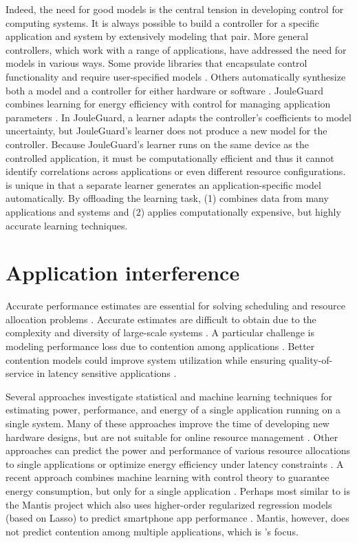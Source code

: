 Indeed, the need for good models is the central tension in developing
control for computing systems.  It is always possible to build a
controller for a specific application and system by extensively
modeling that pair.  More general controllers, which work with a range
of applications, have addressed the need for models in various ways.
Some provide libraries that encapsulate control functionality and
require user-specified models
\cite{ControlWare,Sojka,Rajkumar,POET,SWiFT}.  Others automatically
synthesize both a model and a controller for either hardware
\cite{josep-isca2016} or software \cite{ICSE2014,FSE2015}.  JouleGuard
combines learning for energy efficiency with control for managing
application parameters \cite{JouleGuard}.  In JouleGuard, a learner
adapts the controller's coefficients to model uncertainty, but
JouleGuard's learner does not produce a new model for the controller.
Because JouleGuard's learner runs on the same device as the controlled
application, it must be computationally efficient and thus it cannot
identify correlations across applications or even different resource
configurations.  \SYSTEM{} is unique in that a separate learner
generates an application-specific model automatically.  By offloading
the learning task, \SYSTEM{} (1) combines data from many applications
and systems and (2) applies computationally expensive, but highly
accurate learning techniques.


\section{Application interference}
Accurate performance estimates are essential for solving scheduling
and resource allocation problems \cite{chiang2002impact}.  Accurate
estimates are difficult to obtain due to the complexity and diversity
of large-scale systems \cite{kanev2015profiling}.  A particular
challenge is modeling performance loss due to contention among
applications \cite{kambadur2012measuring}.  Better contention models
could improve system utilization while ensuring quality-of-service in
latency sensitive applications \cite{Bubble-flux}.

Several approaches investigate statistical and machine learning
techniques for estimating power, performance, and energy of a single
application running on a single system.  Many of these approaches
improve the time of developing new hardware designs, but are not
suitable for online resource management
\cite{Yi2003,LeeBrooks2006,CPR}.  Other approaches can predict the
power and performance of various resource allocations to single
applications \cite{Koala} or optimize energy efficiency under latency
constraints \cite{LEO}.  A recent approach combines machine learning
with control theory to guarantee energy consumption, but only for a
single application \cite{JouleGuard}.  Perhaps most similar to
\SYSTEMESP{} is the Mantis project which also uses higher-order
regularized regression models (based on Lasso) to predict smartphone
app performance \cite{kwon2013mantis}.  Mantis, however, does not
predict contention among multiple applications, which is \SYSTEMESP{}'s
focus.

